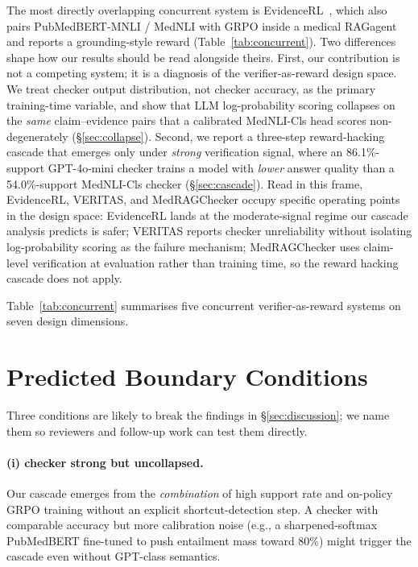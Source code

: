 \documentclass[11pt]{article}
\begin{document}
The most directly overlapping concurrent system is EvidenceRL~\citep{evidencerl2025}, which also pairs PubMedBERT-MNLI / MedNLI with GRPO inside a medical RAGagent and reports a grounding-style reward (Table~\ref{tab:concurrent}). Two differences shape how our results should be read alongside theirs. First, our contribution is not a competing system; it is a diagnosis of the verifier-as-reward design space. We treat checker output distribution, not checker accuracy, as the primary training-time variable, and show that LLM log-probability scoring collapses on the \emph{same} claim--evidence pairs that a calibrated MedNLI-Cls head scores non-degenerately (\S\ref{sec:collapse}). Second, we report a three-step reward-hacking cascade that emerges only under \emph{strong} verification signal, where an 86.1\%-support GPT-4o-mini checker trains a model with \emph{lower} answer quality than a 54.0\%-support MedNLI-Cls checker (\S\ref{sec:cascade}). Read in this frame, EvidenceRL, VERITAS, and MedRAGChecker occupy specific operating points in the design space: EvidenceRL lands at the moderate-signal regime our cascade analysis predicts is safer; VERITAS reports checker unreliability without isolating log-probability scoring as the failure mechanism; MedRAGChecker uses claim-level verification at evaluation rather than training time, so the reward hacking cascade does not apply.

Table~\ref{tab:concurrent} summarises five concurrent verifier-as-reward systems on seven design dimensions.



\section{Predicted Boundary Conditions}
\label{app:boundary}

Three conditions are likely to break the findings in \S\ref{sec:discussion}; we name them so reviewers and follow-up work can test them directly.

\paragraph{(i) checker strong but uncollapsed.}
Our cascade emerges from the \emph{combination} of high support rate and on-policy GRPO training without an explicit shortcut-detection step. A checker with comparable accuracy but more calibration noise (e.g., a sharpened-softmax PubMedBERT fine-tuned to push entailment mass toward 80\%) might trigger the cascade even without GPT-class semantics.
\end{document}
